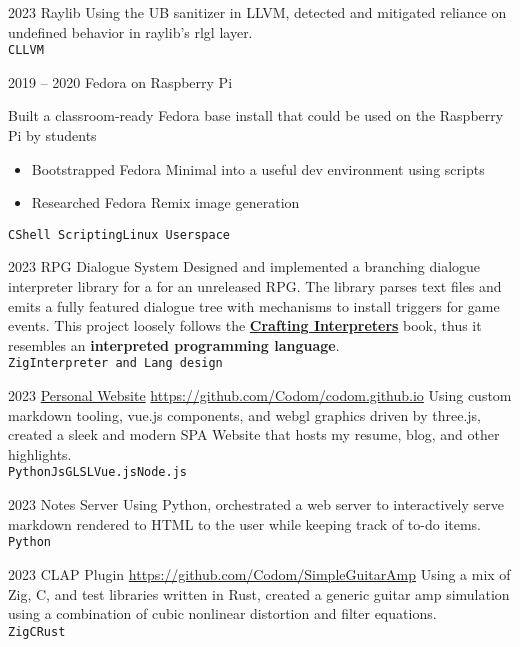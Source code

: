 \documentclass[9pt]{developercv} %
\begin{document}

\begin{entrylist}
	\entry
	{2023}
	{Raylib}
    {}
    {
        Using the UB sanitizer in LLVM, detected and mitigated reliance on undefined behavior in raylib's
        rlgl layer.
	    \\
	    \texttt{C}\slashsep\texttt{LLVM}
    }

	\entry
		{2019 -- 2020}
		{Fedora on Raspberry Pi}
        {}
        {
	Built a classroom-ready Fedora base install that could be used on the Raspberry Pi by students
	\begin{itemize}\itemsep=0em
		\item Bootstrapped Fedora Minimal into a useful dev environment using scripts
		\item Researched Fedora Remix image generation
	\end{itemize}
	\texttt{C}\slashsep\texttt{Shell Scripting}\slashsep\texttt{Linux Userspace}}

\end{entrylist}


\begin{entrylist}
	\entry
	{2023}
	{RPG Dialogue System}
    {}
	{
		Designed and implemented a branching dialogue interpreter library for a
		for an unreleased RPG. The library parses
		text files and emits a fully featured dialogue tree with mechanisms
		to install triggers for game events. This project
		loosely follows the
		{\bf\href{https://craftinginterpreters.com/}{Crafting Interpreters}}
		book, thus it resembles an {\bf interpreted programming language}.
		\\
		\texttt{Zig}\slashsep\texttt{Interpreter and Lang design}
	}

	\entry
	{2023}
	{\href{https://chrisodom.org/}{Personal Website}}
    {\href{https://github.com/Codom/codom.github.io}{https://github.com/Codom/codom.github.io}}
    {
		Using custom markdown tooling, vue.js components, and webgl graphics driven by three.js,
		created a sleek and modern SPA Website that hosts my resume, blog, and other highlights.
	    \\
	    \texttt{Python}\slashsep\texttt{Js}\slashsep\texttt{GLSL}\slashsep\texttt{Vue.js}\slashsep\texttt{Node.js}
    }

	\entry
	{2023}
	{Notes Server}
    {}
    {
        Using Python, orchestrated a web server to interactively serve markdown rendered to
        HTML to the user while keeping track of to-do items.
	    \\
	    \texttt{Python}
    }

	\entry
	{2023}
    {CLAP Plugin}
    {\href{https://github.com/Codom/SimpleGuitarAmp}{https://github.com/Codom/SimpleGuitarAmp}}
    {
        Using a mix of Zig, C, and test libraries written in Rust, created a generic guitar
        amp simulation using a combination of cubic nonlinear distortion and filter equations.
        \\
        \texttt{Zig}\slashsep\texttt{C}\slashsep\texttt{Rust}
    }

\end{entrylist}
\end{document}
